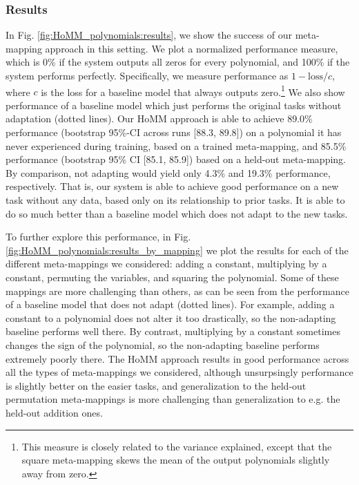 \subsubsection{Results}
In Fig. \ref{fig:HoMM_polynomials:results}, we show the success of our meta-mapping approach in this setting. We plot a normalized performance measure, which is 0\% if the system outputs all zeros for every polynomial, and 100\% if the system performs perfectly. Specifically, we measure performance as \(1 - \text{loss}/c\), where \(c\) is the loss for a baseline model that always outputs zero.\footnote{This measure is closely related to the variance explained, except that the square meta-mapping skews the mean of the output polynomials slightly away from zero.} We also show performance of a baseline model which just performs the original tasks without adaptation (dotted lines). Our HoMM approach is able to achieve 89.0\% performance (bootstrap 95\%-CI across runs [88.3, 89.8]) on a polynomial it has never experienced during training, based on a trained meta-mapping, and 85.5\% performance (bootstrap 95\% CI [85.1, 85.9]) based on a held-out meta-mapping. By comparison, not adapting would yield only 4.3\% and 19.3\% performance, respectively. That is, our system is able to achieve good performance on a new task without any data, based only on its relationship to prior tasks. It is able to do so much better than a baseline model which does not adapt to the new tasks. 

To further explore this performance, in Fig. \ref{fig:HoMM_polynomials:results_by_mapping} we plot the results for each of the different meta-mappings we considered: adding a constant, multiplying by a constant, permuting the variables, and squaring the polynomial. Some of these mappings are more challenging than others, as can be seen from the performance of a baseline model that does not adapt (dotted lines). For example, adding a constant to a polynomial does not alter it too drastically, so the non-adapting baseline performs well there. By contrast, multiplying by a constant sometimes changes the sign of the polynomial, so the non-adapting baseline performs extremely poorly there. The HoMM approach results in good performance across all the types of meta-mappings we considered, although unsurpsingly performance is slightly better on the easier tasks, and generalization to the held-out permutation meta-mappings is more challenging than generalization to e.g. the held-out addition ones. 

